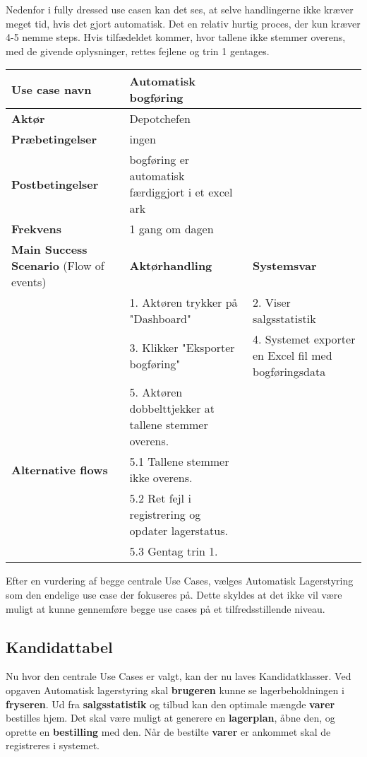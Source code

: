 Nedenfor i fully dressed use casen kan det ses, at selve handlingerne ikke kræver meget tid, hvis det gjort automatisk. Det en relativ hurtig proces, der kun kræver 4-5 nemme steps. 
Hvis tilfædeldet kommer, hvor tallene ikke stemmer overens, med de givende oplysninger, rettes fejlene og trin 1 gentages. 

\begin{longtable}{ |p{120pt}|p{120pt}|p{120pt}| }
    \hline
    \textbf{Use case navn} & Automatisk bogføring & \\
    \hline
    \textbf{Aktør} & Depotchefen & \\
    \hline
    \textbf{Præbetingelser} & ingen & \\
    \hline
    \textbf{Postbetingelser} & bogføring er automatisk færdiggjort i et excel ark & \\
    \hline
    \textbf{Frekvens} & 1 gang om dagen & \\
    \hline
    \textbf{Main Success Scenario} (Flow of events) & \textbf{Aktørhandling} & \textbf{Systemsvar} \\
    \hline
    & 1. Aktøren trykker på "Dashboard" & 2. Viser salgsstatistik \\
    \hline
    & 3. Klikker "Eksporter bogføring" & 4. Systemet exporter en Excel fil med bogføringsdata \\
    \hline
    & 5. Aktøren dobbelttjekker at tallene stemmer overens. & \\
    \hline
    \textbf{Alternative flows} & 5.1 Tallene stemmer ikke overens. & \\
    \hline 
    & 5.2 Ret fejl i registrering og opdater lagerstatus. & \\
    \hline
    & 5.3 Gentag trin 1. & \\
    \hline
\end{longtable}

Efter en vurdering af begge centrale Use Cases, vælges Automatisk Lagerstyring som den endelige use case der fokuseres på. Dette skyldes at det ikke vil være muligt at kunne gennemføre begge use cases på et tilfredsstillende niveau.

\subsection{Kandidattabel}
Nu hvor den centrale Use Cases er valgt, kan der nu laves Kandidatklasser. 
Ved opgaven Automatisk lagerstyring skal \textbf{brugeren} kunne se lagerbeholdningen i \textbf{fryseren}. Ud fra \textbf{salgsstatistik} og tilbud kan den optimale mængde \textbf{varer} bestilles hjem. Det skal være muligt at generere en \textbf{lagerplan}, åbne den, og oprette en \textbf{bestilling} med den. Når de bestilte \textbf{varer} er ankommet skal de registreres i systemet.

